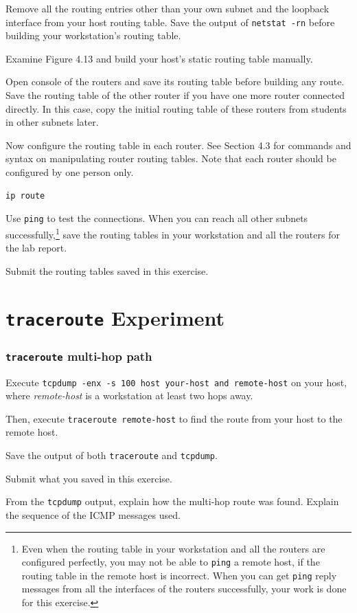 \documentclass{../UTNetLab}
\begin{document}
    Remove all the routing entries other than your own subnet and the loopback interface from your host routing table.
    Save the output of \lstinline{netstat -rn} before building your workstation’s routing table. 

    Examine Figure 4.13 and build your host’s static routing table manually. 

    Open console of the routers and save its routing table before building any route.
    Save the routing table of the other router if you have one more router connected directly.
    In this case, copy the initial routing table of these routers from students in other subnets later. 

    Now configure the routing table in each router.
    See Section 4.3 for commands and syntax on manipulating router routing tables.
    Note that each router should be configured by one person only. 

    \begin{lstlisting}
ip route
    \end{lstlisting}

    Use \lstinline{ping} to test the connections.
    When you can reach all other subnets successfully,\footnote{Even when the routing table in your workstation and all the routers are configured perfectly, you may not be able to \lstinline{ping} a remote host, if the routing table in the remote host is incorrect.
    When you can get \lstinline{ping} reply messages from all the interfaces of the routers successfully, your work is done for this exercise.} save the routing tables in your workstation and all the routers for the lab report.
    
    \begin{report}
    \item Submit the routing tables saved in this exercise.
    \end{report}


\part{\texttt{traceroute} Experiment}
\section{\texttt{traceroute} multi-hop path}
    Execute \lstinline[emph={your-host, remote-host}]{tcpdump -enx -s 100 host your-host and remote-host} on your host, where \textit{remote-host} is a workstation at least two hops away. 

    Then, execute \lstinline[emph={your-host, remote-host}]{traceroute remote-host} to find the route from your host to the remote host. 

    Save the output of both \lstinline{traceroute} and \lstinline{tcpdump}.

    \begin{report}
    \item Submit what you saved in this exercise. 

    \item From the \lstinline{tcpdump} output, explain how the multi-hop route was found.
    Explain the sequence of the ICMP messages used.
    \end{report}
\end{document}
